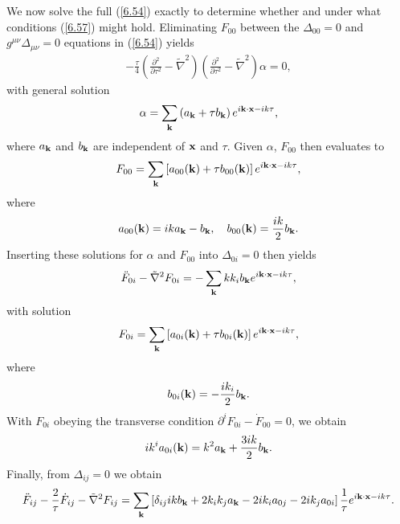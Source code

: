 \documentclass[aps,onecolumn,10pt]{revtex4}
\numberwithin{equation}{section}
\numberwithin{equation}{section}
\begin{document}
We now solve the full (\ref{6.54}) exactly  to determine whether and under what conditions (\ref{6.57}) might hold. Eliminating $F_{00}$ between the $\Delta_{00}=0$ and $g^{\mu\nu}\Delta_{\mu\nu}=0$ equations in (\ref{6.54}) yields
%
\begin{eqnarray}
-\frac{\tau}{4}\left(\frac{\partial ^2}{\partial \tau^2}-\tilde{\nabla}^2\right)\left(\frac{\partial ^2}{\partial \tau^2}-\tilde{\nabla}^2\right)\alpha=0,
\label{6.58}
\end{eqnarray}
%
with general solution
%
\begin{eqnarray}
\alpha=\sum_{\bf k}\left(a_{\bf k}+\tau b_{\bf k}\right)e^{i{\bf k}\cdot {\bf x}-ik\tau},
\label{6.59}
\end{eqnarray}
%
where $a_{\bf k}$ and $b_{\bf k}$ are independent of ${\bf x}$ and $\tau$. Given $\alpha$, $F_{00}$ then evaluates to 
%
\begin{eqnarray}
F_{00}=\sum_{\bf k}\left[a_{00}({\bf k})+\tau b_{00}({\bf k})\right]e^{i{\bf k}\cdot {\bf x}-ik\tau},
\label{6.60}
\end{eqnarray}
%
where
%
\begin{eqnarray}
a_{00}({\bf k})=ika_{\bf k}-b_{\bf k},\quad b_{00}({\bf k})=\frac{ik}{2}b_{\bf k}.
\label{6.61}
\end{eqnarray}
%
Inserting these solutions for $\alpha$ and $F_{00}$ into $\Delta_{0i}=0$ then yields
%
\begin{eqnarray}
\ddot{F}_{0i}-\tilde{\nabla}^2F_{0i}=-\sum_{\bf k}kk_ib_{\bf k}e^{i{\bf k}\cdot {\bf x}-ik\tau},
\label{6.62}
\end{eqnarray}
%
with solution 
%
\begin{eqnarray}
F_{0i}=\sum_{\bf k}\left[a_{0i}({\bf k})+\tau b_{0i}({\bf k})\right]e^{i{\bf k}\cdot {\bf x}-ik\tau},
\label{6.63}
\end{eqnarray}
%
where
%
\begin{eqnarray}
b_{0i}({\bf k})=-\frac{ik_i}{2}b_{\bf k}.
\label{6.64}
\end{eqnarray}
%
With $F_{0i}$ obeying the transverse condition $\partial^iF_{0i}-\dot{F}_{00}=0$, we obtain 
%
\begin{eqnarray}
ik^ia_{0i}({\bf k})=k^2a_{\bf k}+\frac{3ik}{2}b_{\bf k}.
\label{6.65}
\end{eqnarray}
%
Finally, from $\Delta_{ij}=0$ we obtain 
%
\begin{eqnarray}
 \ddot{F}_{ij}  - \frac{2}{\tau} \dot{F}_{ij} - \tilde{\nabla}^2F_{ij}=
 \sum_{\bf k}\left[\delta_{ij}ikb_{\bf k}+2k_ik_ja_{\bf k}-2ik_ia_{0j}-2ik_ja_{0i}\right]\frac{1}{\tau}e^{i{\bf k}\cdot {\bf x}-ik\tau}.
\label{6.66}
\end{eqnarray}
\end{document}
